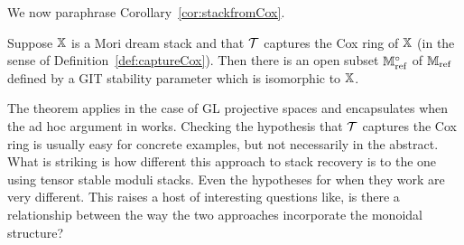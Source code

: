 \documentclass[12pt]{amsart}
\begin{document}

We now paraphrase Corollary~\ref{cor:stackfromCox}.
\begin{theorem}  \label{thm:3}
Suppose $\mathbb{X}$ is a Mori dream stack and that $\mathcal{T}$ captures the Cox ring of $\mathbb{X}$ (in the sense of Definition~\ref{def:captureCox}). 
Then there is an open subset $\mathbb{M}_{\textup{ref}}^\circ$ of $\mathbb{M}_{\textup{ref}}$ defined by a GIT stability parameter which is isomorphic to $\mathbb{X}$.
\end{theorem}
The theorem applies in the case of GL projective spaces and encapsulates when the ad hoc argument in \cite{AU} works. Checking the hypothesis that $\mathcal{T}$ captures the Cox ring is usually easy for concrete examples, but not necessarily in the abstract. What is striking is how different this approach to stack recovery is to the one using tensor stable moduli stacks. Even the hypotheses for when they work are very different. This raises a host of interesting questions like, is there a relationship between the way the two approaches incorporate the monoidal structure?
\end{document}
